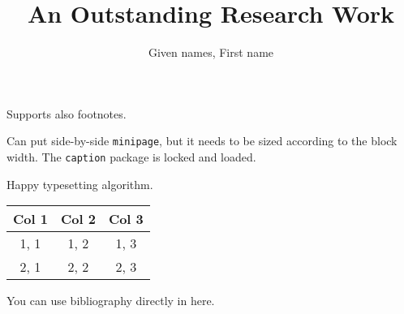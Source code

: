 \documentclass[a2paper]{bigsposter}
\author{Given names, First name}
\title{An Outstanding Research Work}
\institute{Famous Research Institute}
\newcommand{\emptybox}[2]{\framebox[#1]{\rule{0pt}{#2}}}
\begin{document}
  \maketitle
  \begin{blockrow}
    \textcolor{lightgray}{\lipsum[1]}
    Supports also footnotes.
  \blockbreak
    \textcolor{lightgray}{\lipsum[2]}
    \begin{minipage}[t]{0.3\blockwidth}
      Can put side-by-side \texttt{minipage}, but it needs to be sized according to the block width. The \texttt{caption} package is locked and loaded.
    \end{minipage}
    \begin{minipage}[t]{0.7\blockwidth}
      \begin{blockfigure}
        \emptybox{0.9\textwidth}{4em}
      \end{blockfigure}
    \end{minipage}
  \end{blockrow}
  \begin{blockrow}[3]
    \begin{blockfigure}
      \emptybox{0.8\blockwidth}{5em}
    \end{blockfigure}
    \textcolor{lightgray}{\lipsum[3]}
    \IncMargin{1em}
    \begin{algorithm}[H]
      \caption{Happy typesetting algorithm.}
    \end{algorithm}
    \DecMargin{1em}
  \blockbreak
    \textcolor{lightgray}{\lipsum[4]}
    \begin{blocktable}
      \begin{tabular}{c|c|c}
        \textbf{Col 1} & \textbf{Col 2} & \textbf{Col 3} \\\hline\hline
        1, 1 & 1, 2 & 1, 3 \\
        2, 1 & 2, 2 & 2, 3 \\\hline
      \end{tabular}
    \end{blocktable}
    \textcolor{lightgray}{\lipsum[5]}
  \blockbreak
    \textcolor{lightgray}{\lipsum[6]}
    You can use bibliography directly in here.
    \nocite{*}
    
    \blockfoot
  \end{blockrow}
\end{document}

